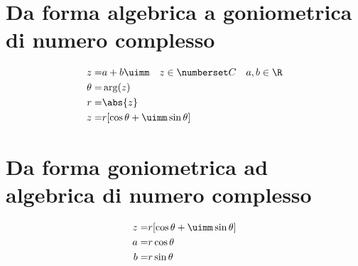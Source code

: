 \section{Da forma algebrica a goniometrica di numero complesso}
\begin{align*}
z=&a+b\uimm\quad z\in\Co\quad a,b\in\R\\
\theta=&\arg(z)\\
r=&\abs{z}\\
z=&r[\cos\theta+\uimm\sin\theta]
\end{align*}
\section{Da forma goniometrica ad algebrica di numero complesso}
\begin{align*}
z=&r[\cos\theta+\uimm\sin\theta]\\
a=&r\cos\theta\\
b=&r\sin\theta
\end{align*}
